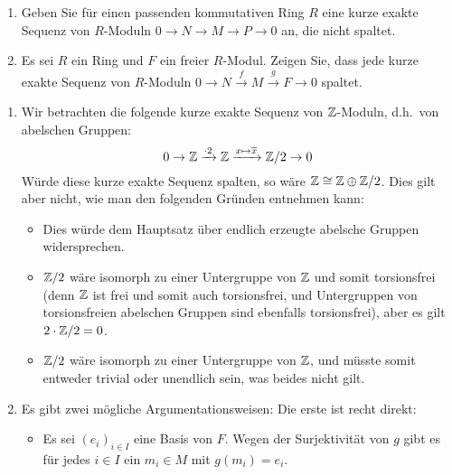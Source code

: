 \begin{question}[subtitle = Zum Spalten kurzer exakter Sequenzen]
  \begin{enumerate}
    \item
      Geben Sie für einen passenden kommutativen Ring $R$ eine kurze exakte Sequenz von $R$-Moduln $0 \to N \to M \to P \to 0$ an, die nicht spaltet.
    \item
      Es sei $R$ ein Ring und $F$ ein freier $R$-Modul.
      Zeigen Sie, dass jede kurze exakte Sequenz von $R$-Moduln $0 \to N \xrightarrow{f} M \xrightarrow{g} F \to 0$ spaltet.
  \end{enumerate}
\end{question}


\begin{solution}
  \begin{enumerate}
    \item
      Wir betrachten die folgende kurze exakte Sequenz von $\mathbb{Z}$-Moduln, d.h.\ von abelschen Gruppen:
      \[
                                              0
        \to                                   \mathbb{Z}
        \xrightarrow{\cdot 2}                 \mathbb{Z}
        \xrightarrow{x \mapsto \overline{x}}  \mathbb{Z}/2
        \to                                   0
      \]
      Würde diese kurze exakte Sequenz spalten, so wäre $\mathbb{Z} \cong \mathbb{Z} \oplus \mathbb{Z}/2$.
      Dies gilt aber nicht, wie man den folgenden Gründen entnehmen kann:
      \begin{itemize}
        \item
          Dies würde dem Hauptsatz über endlich erzeugte abelsche Gruppen widersprechen.
        \item
          $\mathbb{Z}/2$ wäre isomorph zu einer Untergruppe von $\mathbb{Z}$ und somit torsionsfrei (denn $\mathbb{Z}$ ist frei und somit auch torsionsfrei, und Untergruppen von torsionsfreien abelschen Gruppen sind ebenfalls torsionsfrei), aber es gilt $2 \cdot \mathbb{Z}/2 = 0$.
        \item
          $\mathbb{Z}/2$ wäre isomorph zu einer Untergruppe von $\mathbb{Z}$, und müsste somit entweder trivial oder unendlich sein, was beides nicht gilt.
      \end{itemize}
    \item
      Es gibt zwei mögliche Argumentationsweisen:
      Die erste ist recht direkt:
      \begin{itemize}
        \item
          Es sei $(e_i)_{i \in I}$ eine Basis von $F$.
          Wegen der Surjektivität von $g$ gibt es für jedes $i \in I$ ein $m_i \in M$ mit $g(m_i) = e_i$.

\end{itemize}
\end{enumerate}
\end{solution}
